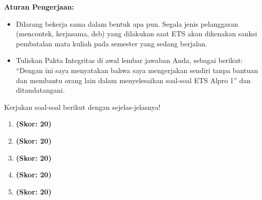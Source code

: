 \documentclass[10pt,openany,a4paper]{article}
\begin{document}
\indent
\textbf{Aturan Pengerjaan:}
\begin{itemize}
    \item Dilarang bekerja sama dalam bentuk apa pun. Segala jenis pelanggaran (mencontek, kerjasama, dsb) yang dilakukan saat ETS akan dikenakan sanksi pembatalan mata kuliah pada semester yang sedang berjalan.
    \item Tuliskan Pakta Integritas di awal lembar jawaban Anda, sebagai berikut: ``Dengan ini saya menyatakan bahwa saya mengerjakan sendiri tanpa bantuan dan membantu orang lain dalam menyelesaikan soal-soal ETS Alpro 1'' dan ditandatangani.
\end{itemize}

\noindent
Kerjakan soal-soal berikut dengan sejelas-jelasnya!
\begin{enumerate}
    \item \textbf{(Skor: 20)}
    \item \textbf{(Skor: 20)}
    \item \textbf{(Skor: 20)}
    \item \textbf{(Skor: 20)}
    \item \textbf{(Skor: 20)}
\end{enumerate}
\end{document}
